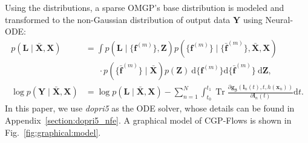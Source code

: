 \documentclass[sn-mathphys-num]{sn-jnl}
\begin{document}
Using the distributions, a sparse OMGP's base distribution is modeled and transformed to the non-Gaussian distribution of output data $\mathbf Y$ using Neural-ODE:
\begin{align}
    p({\mathbf{L}}\mid \bar{\mathbf X}, {\mathbf X}) & =\int p({\mathbf{L}}\mid \{{\mathbf{f}}^{(m)}\}, {\mathbf{Z}}) p(\{{\mathbf{f}}^{(m)}\}\mid\{\bar{\mathbf{f}}^{(m)}\},\bar{\mathbf{X}}, {\mathbf X}) \nonumber \\ & ~~~~~~~ \cdot p(\{\bar{\mathbf{f}}^{(m)}\}\mid \bar{\mathbf X})p({\mathbf{Z}}) ~ \mathrm d \{{\mathbf{f}}^{(m)}\}\mathrm d \{\bar{\mathbf{f}}^{(m)}\}~\mathrm d \mathbf Z, \\
 \log p(\mathbf{Y}\mid \bar{\mathbf{X}}, \mathbf{X})  &= \log p({\mathbf{L}}\mid \bar{\mathbf X}, {\mathbf X}) 
    - \sum_{n=1}^{N} \int_{t_0}^{t_1} \operatorname{Tr} \frac{\partial {\mathbf g}_{\boldsymbol{\beta}}(\mathbf{l}_n(t),t,h({\mathbf x_n}))}{\partial \mathbf{l}_{n}(t)} \mathrm{d} t.
\end{align}
In this paper, we use \textit{dopri5} as the ODE solver, whose details can be found in Appendix~\ref{section:dopri5_nfe}.
A graphical model of CGP-Flows is shown in Fig.~\ref{fig:graphical:model}.
\end{document}

